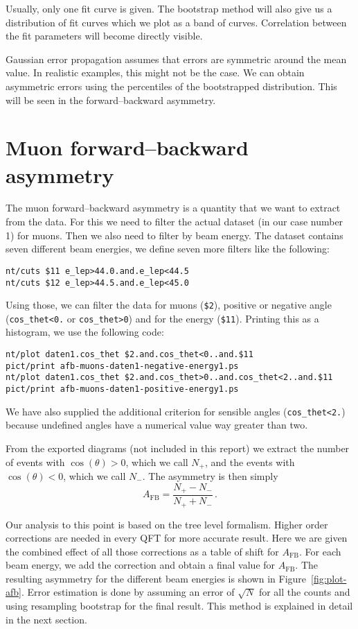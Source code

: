 \documentclass[11pt, english, fleqn, DIV=15, headinclude, BCOR=2cm]{scrreprt}
\begin{document}
Usually, only one fit curve is given. The bootstrap method will also give us a
distribution of fit curves which we plot as a band of curves. Correlation
between the fit parameters will become directly visible.

Gaussian error propagation assumes that errors are symmetric around the mean
value. In realistic examples, this might not be the case. We can obtain
asymmetric errors using the percentiles of the bootstrapped distribution. This
will be seen in the forward--backward asymmetry.

\section{Muon forward--backward asymmetry}

The muon forward--backward asymmetry is a quantity that we want to extract from
the data. For this we need to filter the actual dataset (in our case number 1)
for muons. Then we also need to filter by beam energy. The dataset contains
seven different beam energies, we define seven more filters like the following:

\begin{lstlisting}
nt/cuts $11 e_lep>44.0.and.e_lep<44.5
nt/cuts $12 e_lep>44.5.and.e_lep<45.0
\end{lstlisting}

Using those, we can filter the data for muons (\texttt{\$2}), positive or
negative angle (\texttt{cos\_thet<0.} or \texttt{cos\_thet>0}) and for the energy (\texttt{\$11}). Printing this as
a histogram, we use the following code:

\begin{lstlisting}
nt/plot daten1.cos_thet $2.and.cos_thet<0..and.$11
pict/print afb-muons-daten1-negative-energy1.ps
nt/plot daten1.cos_thet $2.and.cos_thet>0..and.cos_thet<2..and.$11
pict/print afb-muons-daten1-positive-energy1.ps
\end{lstlisting}

We have also supplied the additional criterion for sensible angles
(\texttt{cos\_thet<2.}) because undefined angles have a numerical value way
greater than two.

From the exported diagrams (not included in this report) we extract the number
of events with $\cos(\theta) > 0$, which we call $N_+$, and the events with
$\cos(\theta) < 0$, which we call $N_-$. The asymmetry is then simply
\[
    A_\text{FB} = \frac{N_+ - N_-}{N_+ + N_-} \,.
\]

Our analysis to this point is based on the tree level formalism. Higher order
corrections are needed in every QFT for more accurate result. Here we are given
the combined effect of all those corrections as a table of shift for
$A_\text{FB}$. For each beam energy, we add the correction and obtain a final
value for $A_\text{FB}$. The resulting asymmetry for the different beam
energies is shown in Figure~\ref{fig:plot-afb}. Error estimation is done by
assuming an error of $\sqrt{N}$ for all the counts and using resampling
bootstrap for the final result. This method is explained in detail in the next
section.
\end{document}
